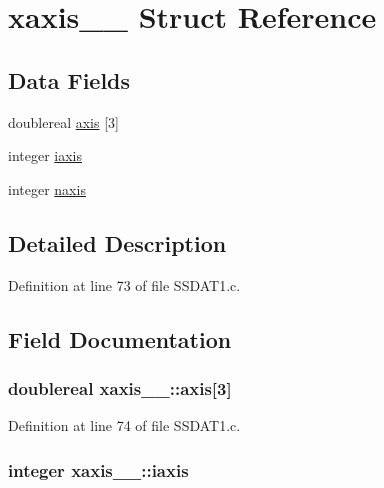 \hypertarget{structxaxis__1__}{}\section{xaxis\+\_\+\_\+ Struct Reference}
\label{structxaxis__1__}
\subsection*{Data Fields}
\begin{DoxyCompactItemize}
\item 
doublereal \hyperlink{structxaxis__1___a5907f45e0318780004d09f9c828e1ef5}{axis} \mbox{[}3\mbox{]}
\item 
integer \hyperlink{structxaxis__1___a6dff12d77d8e5140756b98fed4573628}{iaxis}
\item 
integer \hyperlink{structxaxis__1___ae5c943405bf2d5a323f6f2997afe2888}{naxis}
\end{DoxyCompactItemize}


\subsection{Detailed Description}


Definition at line 73 of file S\+S\+D\+A\+T1.\+c.



\subsection{Field Documentation}
\subsubsection[{\texorpdfstring{axis}{axis}}]{\setlength{\rightskip}{0pt plus 5cm}doublereal xaxis\+\_\+\_\+\+::axis\mbox{[}3\mbox{]}}\hypertarget{structxaxis__1___a5907f45e0318780004d09f9c828e1ef5}{}\label{structxaxis__1___a5907f45e0318780004d09f9c828e1ef5}


Definition at line 74 of file S\+S\+D\+A\+T1.\+c.

\subsubsection[{\texorpdfstring{iaxis}{iaxis}}]{\setlength{\rightskip}{0pt plus 5cm}integer xaxis\+\_\+\_\+\+::iaxis}\hypertarget{structxaxis__1___a6dff12d77d8e5140756b98fed4573628}{}\label{structxaxis__1___a6dff12d77d8e5140756b98fed4573628}


